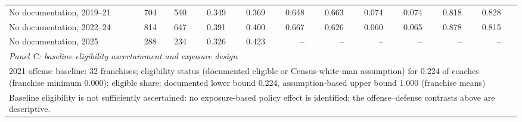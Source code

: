 \begin{table}[H]
{\begin{tabular}{lrrrrrrrrrrr}
No documentation, 2019--21 & 704 & 540 & 0.349 & 0.369 & 0.648 & 0.663 & 0.074 & 0.074 & 0.818 & 0.828 &  \\
No documentation, 2022--24 & 814 & 647 & 0.391 & 0.400 & 0.667 & 0.626 & 0.060 & 0.065 & 0.878 & 0.815 &  \\
No documentation, 2025 & 288 & 234 & 0.326 & 0.423 & -- & -- & -- & -- & -- & -- &  \\
\midrule
\multicolumn{12}{l}{\textit{Panel C: baseline eligibility ascertainment and exposure design}} \\
\multicolumn{12}{p{0.95\textwidth}}{2021 offense baseline: 32 franchises; eligibility status (documented eligible or Census-white-man assumption) for 0.224 of coaches (franchise minimum 0.000); eligible share: documented lower bound 0.224, assumption-based upper bound 1.000 (franchise means)} \\
\multicolumn{12}{p{0.95\textwidth}}{Baseline eligibility is not sufficiently ascertained: no exposure-based policy effect is identified; the offense--defense contrasts above are descriptive.} \\
\bottomrule
\end{tabular}
}
\par\smallskip
\begin{minipage}{\textwidth}
\footnotesize

\end{minipage}
\end{table}
